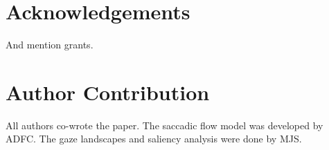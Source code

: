 \documentclass[a4paper, twocolumn, oneside, 10pt]{article}
\begin{document}


\section*{Acknowledgements}

And mention grants. 

\section*{Author Contribution}

All authors co-wrote the paper. The saccadic flow model was developed by ADFC. The gaze landscapes and saliency analysis were done by MJS.

\appendix



\small

\end{document}
